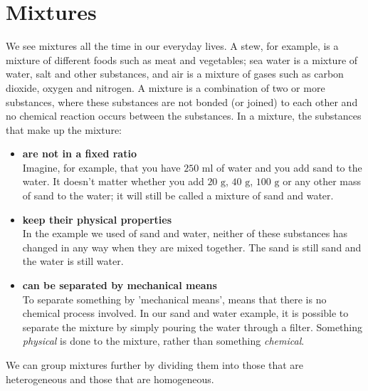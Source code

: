             \section{Mixtures}
            \nopagebreak
            \label{m38708*id62584}We see mixtures all the time in our everyday lives. A stew, for example, is a mixture of different foods such as meat and vegetables; sea water is a mixture of water, salt and other substances, and air is a mixture of gases such as carbon dioxide, oxygen and nitrogen.
 { A mixture is a combination of two or more substances, where these substances are not bonded (or joined) to each other and no chemical reaction occurs between the substances. } 
In a mixture, the substances that make up the mixture:
\begin{itemize}[noitemsep]
\item \textbf{are not in a fixed ratio} \\
Imagine, for example, that you have $250 \text{ ml}$ of water and you add sand to the water. It doesn't matter whether you add $20 \text{ g}$, $40 \text{ g}$, $100 \text{ g}$ or any other mass of sand to the water; it will still be called a mixture of sand and water.
\item \textbf{keep their physical properties} \\
In the example we used of sand and water, neither of these substances has changed in any way when they are mixed together. The sand is still sand and the water is still water.
\item \textbf{can be separated by mechanical means} \\
To separate something by 'mechanical means', means that there is no chemical process involved. In our sand and water example, it is possible to separate the mixture by simply pouring the water through a filter. Something \textsl{physical} is done to the mixture, rather than something \textsl{chemical}.
\end{itemize}
We can group mixtures further by dividing them into those that are heterogeneous and those that are homogeneous.
      \label{m38708*uid5}
